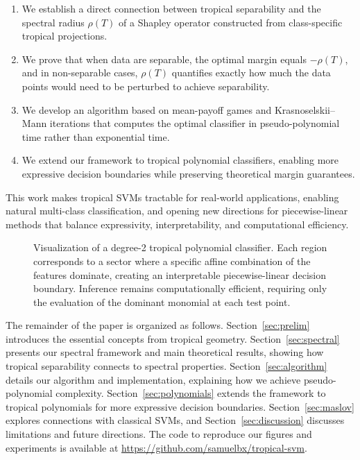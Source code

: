 \documentclass{article}
\begin{document}
\begin{enumerate}
    \item We establish a direct connection between tropical separability and the spectral radius $\rho(T)$ of a Shapley operator constructed from class-specific tropical projections.
    
    \item We prove that when data are separable, the optimal margin equals $-\rho(T)$, and in non-separable cases, $\rho(T)$ quantifies exactly how much the data points would need to be perturbed to achieve separability.
    
    \item We develop an algorithm based on mean-payoff games and Krasnoselskii--Mann iterations that computes the optimal classifier in pseudo-polynomial time rather than exponential time.
    
    \item We extend our framework to tropical polynomial classifiers, enabling more expressive decision boundaries while preserving theoretical margin guarantees.
\end{enumerate}

This work makes tropical SVMs tractable for real-world applications, enabling natural multi-class classification, and opening new directions for piecewise-linear methods that balance expressivity, interpretability, and computational efficiency.

\begin{figure}[h]
    \centering
    \resizebox{0.99\textwidth}{!}{\clipbox{0.15\width{} 0.30\height{} 0.15\width{} 0.30\height{}}{}}
    \caption{Visualization of a degree-2 tropical polynomial classifier. Each region corresponds to a sector where a specific affine combination of the features dominate, creating an interpretable piecewise-linear decision boundary. Inference remains computationally efficient, requiring only the evaluation of the dominant monomial at each test point.}
    \label{fig:tropical_hyperplane}
\end{figure}

The remainder of the paper is organized as follows. Section~\ref{sec:prelim} introduces the essential concepts from tropical geometry. Section~\ref{sec:spectral} presents our spectral framework and main theoretical results, showing how tropical separability connects to spectral properties. Section~\ref{sec:algorithm} details our algorithm and implementation, explaining how we achieve pseudo-polynomial complexity. Section~\ref{sec:polynomials} extends the framework to tropical polynomials for more expressive decision boundaries. Section~\ref{sec:maslov} explores connections with classical SVMs, and Section~\ref{sec:discussion} discusses limitations and future directions. The code to reproduce our figures and experiments is available at \url{https://github.com/samuelbx/tropical-svm}.
\end{document}
